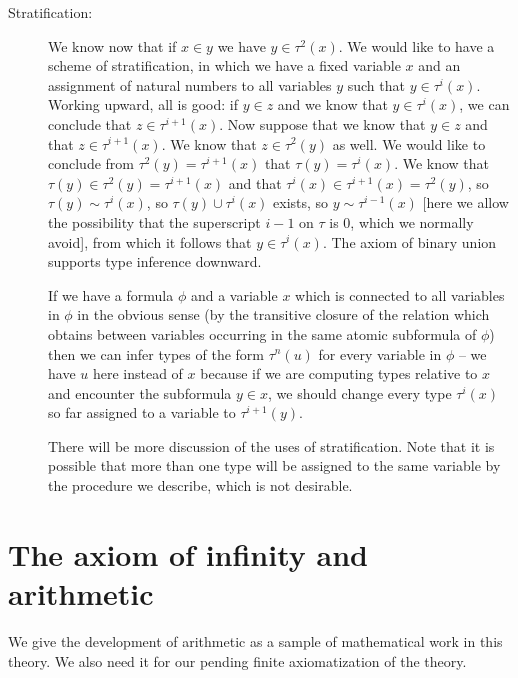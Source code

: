 \documentclass[12pt]{article}
\begin{document}
\begin{description}
\item[Stratification:]  We know now that if $x \in y$ we have $y \in \tau^2(x)$.   We would like to have a scheme of stratification, in which we have a fixed variable $x$
and an assignment of natural numbers to all variables $y$ such that $y \in \tau^i(x)$.  Working upward, all is good:  if $y \in z$ and we know that $y \in \tau^i(x)$, we can conclude
that $z \in \tau^{i+1}(x)$.  Now suppose that we know that $y \in z$ and that $z \in \tau^{i+1}(x)$.  We know that $z \in \tau^2(y)$ as well.   We would like to conclude
from $\tau^2(y) = \tau^{i+1}(x)$ that $\tau(y) = \tau^i(x)$.  We know that $\tau(y) \in \tau^2(y) = \tau^{i+1}(x)$ and that $\tau^i(x) \in \tau^{i+1}(x)=\tau^2(y)$, so
$\tau(y) \sim \tau^i(x)$, so $\tau(y) \cup \tau^i(x)$ exists, so  $y \sim \tau^{i-1}(x)$ [here we allow the possibility that the superscript $i-1$ on $\tau$ is 0, which we normally avoid], from which it follows
that $y \in \tau^i(x)$.  The axiom of binary union supports type inference downward.  

If we have a formula $\phi$ and a variable $x$ which is connected to all variables in $\phi$ in the obvious sense (by the transitive closure of the relation which obtains between variables occurring in the same atomic subformula of $\phi$) then we can infer types of the form $\tau^n(u)$ for every variable in $\phi$ -- we have $u$ here instead of $x$ because if we are computing types relative to $x$ and encounter the subformula $y \in x$, we should change every type $\tau^i(x)$ so far assigned to a variable to $\tau^{i+1}(y)$.

There will be more discussion of the uses of stratification.  Note that it is possible that more than one type will be assigned to the same variable by the procedure we describe, which is not desirable.

\end{description}

\section{The axiom of infinity and arithmetic}

We give the development of arithmetic as a sample of mathematical work in this theory.  We also need it for our pending finite axiomatization of the theory.
\end{document}
